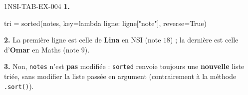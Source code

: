 \begin{corrige}{1NSI-TAB-EX-004}
\textbf{1.}
\begin{python}
tri = sorted(notes, key=lambda ligne: ligne["note"], reverse=True)
\end{python}

\textbf{2.} La première ligne est celle de \textbf{Lina} en NSI (note $18$) ; la dernière
est celle d'\textbf{Omar} en Maths (note $9$).

\textbf{3.} Non, \lstinline{notes} n'est \textbf{pas} modifiée : \lstinline{sorted} renvoie
toujours une \textbf{nouvelle} liste triée, sans modifier la liste passée en argument
(contrairement à la méthode \lstinline{.sort()}).
\end{corrige}
